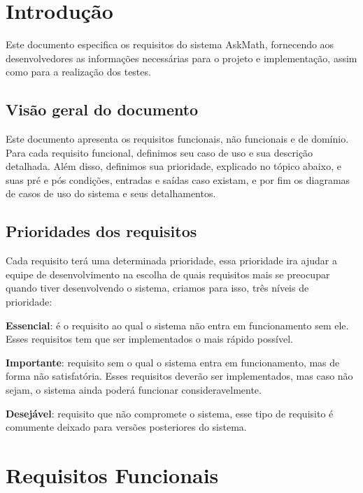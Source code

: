 \label{ap:requisitos}

\section{Introdução}
Este documento especifica os requisitos do sistema AskMath, fornecendo aos desenvolvedores as informações necessárias para o projeto e implementação, assim como para a realização dos testes. 

\subsection{Visão geral do documento}
Este documento apresenta os requisitos funcionais, n\~ao funcionais e de domínio. Para cada requisito funcional, definimos seu caso de uso e sua descrição detalhada. Além disso, definimos sua 
prioridade, explicado no tópico abaixo, e suas pré e pós condições, entradas e saídas caso existam, e por fim os diagramas de casos de uso do sistema e seus detalhamentos.

\subsection{Prioridades dos requisitos}
Cada requisito terá uma determinada prioridade, essa prioridade ira ajudar a equipe de desenvolvimento na escolha de quais requisitos mais se preocupar quando tiver desenvolvendo o sistema, criamos para isso, três níveis de prioridade:

\begin{alineascomponto}
	\item \textbf{Essencial}: é o requisito ao qual o sistema não entra em funcionamento sem ele. Esses requisitos tem que ser implementados o mais rápido possível. 
    \item \textbf{Importante}: requisito sem o qual o sistema entra em funcionamento, mas de forma não satisfatória. Esses requisitos deverão ser implementados, mas caso não sejam, o sistema ainda 
poderá funcionar consideravelmente.
	\item \textbf{Desejável}: requisito que não compromete o sistema, esse tipo de requisito é comumente deixado para versões posteriores do sistema.
\end{alineascomponto}

\section{Requisitos Funcionais}

